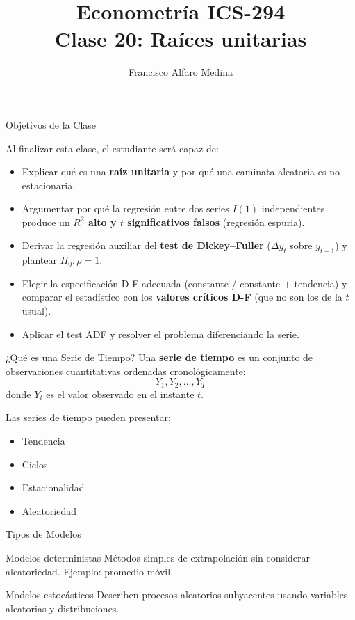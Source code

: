 \documentclass{beamer}
\title[ICS-294]{Econometría ICS-294\\ \small{Clase 20: Raíces unitarias}}
\author{Francisco Alfaro Medina}
\institute[USM]
{Universidad Técnica Federico Santa María\\ %
	\medskip
	\textit{francisco.alfaro@usm.cl} %

}
\date{}
\begin{document}
\frame{\titlepage}
\logo{}


\begin{frame}{Objetivos de la Clase}

Al finalizar esta clase, el estudiante será capaz de:

\begin{itemize}
    \item[\checkmark] Explicar qué es una \textbf{raíz unitaria} y por qué una caminata aleatoria es no estacionaria.
    \item[\checkmark] Argumentar por qué la regresión entre dos series $I(1)$ independientes produce un \textbf{$R^2$ alto y $t$ significativos falsos} (regresión espuria).
    \item[\checkmark] Derivar la regresión auxiliar del \textbf{test de Dickey--Fuller} ($\Delta y_t$ sobre $y_{t-1}$) y plantear $H_0:\rho=1$.
    \item[\checkmark] Elegir la especificación D-F adecuada (constante / constante $+$ tendencia) y comparar el estadístico con los \textbf{valores críticos D-F} (que no son los de la $t$ usual).
    \item[\checkmark] Aplicar el test ADF y resolver el problema diferenciando la serie.
\end{itemize}

\end{frame}


\begin{frame}{¿Qué es una Serie de Tiempo?}
Una \textbf{serie de tiempo} es un conjunto de observaciones cuantitativas ordenadas cronológicamente:
\[
Y_1, Y_2, ..., Y_T
\]
donde $Y_t$ es el valor observado en el instante $t$.

Las series de tiempo pueden presentar:
\begin{itemize}
    \item Tendencia
    \item Ciclos
    \item Estacionalidad
    \item Aleatoriedad
\end{itemize}
\end{frame}

\begin{frame}{Tipos de Modelos}
\begin{block}{Modelos deterministas}
Métodos simples de extrapolación sin considerar aleatoriedad. Ejemplo: promedio móvil.
\end{block}

\begin{block}{Modelos estocásticos}
Describen procesos aleatorios subyacentes usando variables aleatorias y distribuciones.
\end{block}
\end{frame}
\end{document}
